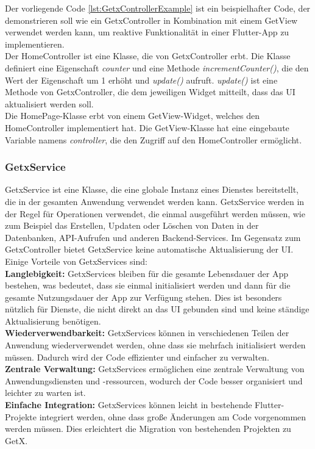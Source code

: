 Der vorliegende Code \ref{lst:GetxControllerExample} ist ein beispielhafter Code, der demonstrieren soll wie ein GetxController in Kombination mit einem GetView verwendet werden kann, um reaktive Funktionalität in einer Flutter-App zu implementieren.
\\
Der HomeController ist eine Klasse, die von GetxController erbt. Die Klasse definiert eine Eigenschaft \textit{counter} und eine Methode \textit{incrementCounter()}, die den Wert der Eigenschaft um 1 erhöht und \textit{update()} aufruft. \textit{update()} ist eine Methode von GetxController, die dem jeweiligen Widget mitteilt, dass das UI aktualisiert werden soll.
\\
Die HomePage-Klasse erbt von einem GetView-Widget, welches den HomeController implementiert hat. Die GetView-Klasse hat eine eingebaute Variable namens \textit{controller}, die den Zugriff auf den HomeController ermöglicht.


\subsubsection{GetxService}
GetxService ist eine Klasse, die eine globale Instanz eines Dienstes bereitstellt, die in der gesamten Anwendung verwendet werden kann. GetxService werden in der Regel für Operationen verwendet, die einmal ausgeführt werden müssen, wie zum Beispiel das Erstellen, Updaten oder Löschen von Daten in der Datenbanken, API-Aufrufen und anderen Backend-Services. Im Gegensatz zum GetxController bietet GetxService keine automatische Aktualisierung der UI.
\\
Einige Vorteile von GetxServices sind:
\\
\textbf{Langlebigkeit:}
GetxServices bleiben für die gesamte Lebensdauer der App bestehen, was bedeutet, dass sie einmal initialisiert werden und dann für die gesamte Nutzungsdauer der App zur Verfügung stehen. Dies ist besonders nützlich für Dienste, die nicht direkt an das UI gebunden sind und keine ständige Aktualisierung benötigen.
\\
\textbf{Wiederverwendbarkeit:}
GetxServices können in verschiedenen Teilen der Anwendung wiederverwendet werden, ohne dass sie mehrfach initialisiert werden müssen. Dadurch wird der Code effizienter und einfacher zu verwalten.
\\
\textbf{Zentrale Verwaltung:}
GetxServices ermöglichen eine zentrale Verwaltung von Anwendungsdiensten und -ressourcen, wodurch der Code besser organisiert und leichter zu warten ist.
\\
\textbf{Einfache Integration:}
GetxServices können leicht in bestehende Flutter-Projekte integriert werden, ohne dass große Änderungen am Code vorgenommen werden müssen. Dies erleichtert die Migration von bestehenden Projekten zu GetX.

